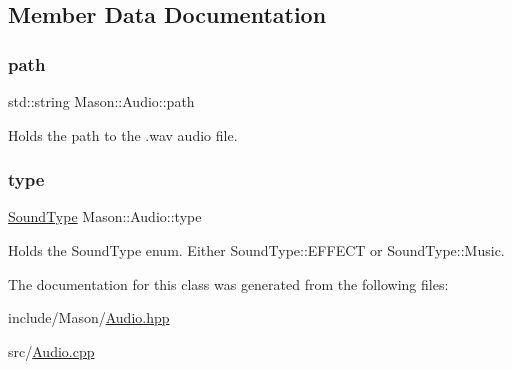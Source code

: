 \subsection{Member Data Documentation}
\hypertarget{class_mason_1_1_audio_a762cc6174ce20a011fe1e3a36e649204}{}\label{class_mason_1_1_audio_a762cc6174ce20a011fe1e3a36e649204} 
\subsubsection{\texorpdfstring{path}{path}}
{\footnotesize\ttfamily std\+::string Mason\+::\+Audio\+::path}



Holds the path to the .wav audio file. 

\hypertarget{class_mason_1_1_audio_a100d9da58685f865bf03dcf44a55fb63}{}\label{class_mason_1_1_audio_a100d9da58685f865bf03dcf44a55fb63} 
\subsubsection{\texorpdfstring{type}{type}}
{\footnotesize\ttfamily \hyperlink{namespace_mason_a158d651086d1ba1aacc4c37125b27657}{Sound\+Type} Mason\+::\+Audio\+::type}



Holds the Sound\+Type enum. Either Sound\+Type\+::\+E\+F\+F\+E\+CT or Sound\+Type\+::\+Music. 



The documentation for this class was generated from the following files\+:\begin{DoxyCompactItemize}
\item 
include/\+Mason/\hyperlink{_audio_8hpp}{Audio.\+hpp}\item 
src/\hyperlink{_audio_8cpp}{Audio.\+cpp}\end{DoxyCompactItemize}
